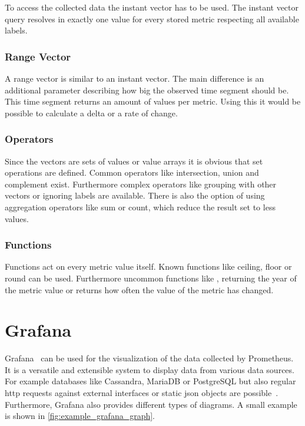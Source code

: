 To access the collected data the instant vector has to be used. The instant vector query resolves in exactly one value for every stored metric respecting all available labels.

\subsubsection{Range Vector}

A range vector is similar to an instant vector. The main difference is an additional parameter describing how big the observed time segment should be. This time segment returns an amount of values per metric. Using this it would be possible to calculate a delta or a rate of change.

\subsubsection{Operators}

Since the vectors are sets of values or value arrays it is obvious that set operations are defined. Common operators like intersection, union and complement exist. Furthermore complex operators like grouping with other vectors or ignoring labels are available. There is also the option of using aggregation operators like sum or count, which reduce the result set to less values.

\subsubsection{Functions}

Functions act on every metric value itself. Known functions like ceiling, floor or round can be used. Furthermore uncommon functions like , returning the year of the metric value or  returns how often the value of the metric has changed.

\section{Grafana}
\label{sec:grafana}

Grafana~\citep{GrafanaHomepage} can be used for the visualization of the data collected by Prometheus. It is a versatile and extensible system to display data from various data sources. For example databases like Cassandra, MariaDB or PostgreSQL but also regular \gls{http} requests against external interfaces or static \gls{json} objects are possible~\cite{GrafanaDataSources}. Furthermore, Grafana also provides different types of diagrams. A small example is shown in \cref{fig:example_grafana_graph}.

